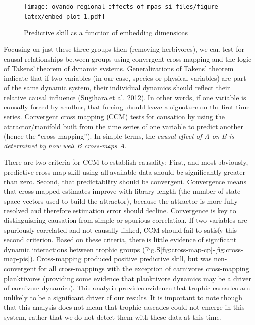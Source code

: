 \documentclass[]{article}
\begin{document}
\begin{figure}
\centering
\texttt{[image: ovando-regional-effects-of-mpas-si\_files/figure-latex/embed-plot-1.pdf]}
\caption{\label{fig:embed-plot}Predictive skill as a function of embedding dimensions}
\end{figure}

Focusing on just these three groups then (removing herbivores), we can test for causal relationships between groups using convergent cross mapping and the logic of Takens' theorem of dynamic systems. Generalizations of Takens' theorem indicate that if two variables (in our case, species or physical variables) are part of the same dynamic system, their individual dynamics should reflect their relative causal influence (Sugihara et al. 2012). In other words, if one variable is causally forced by another, that forcing should leave a signature on the first time series. Convergent cross mapping (CCM) tests for causation by using the attractor/manifold built from the time series of one variable to predict another (hence the ``cross-mapping''). In simple terms, the \emph{causal effect of A on B is determined by how well B cross-maps A}.

There are two criteria for CCM to establish causality: First, and most obviously, predictive cross-map skill using all available data should be significantly greater than zero. Second, that predictability should be convergent. Convergence means that cross-mapped estimates improve with library length (the number of state-space vectors used to build the attractor), because the attractor is more fully resolved and therefore estimation error should decline. Convergence is key to distinguishing causation from simple or spurious correlation. If two variables are spuriously correlated and not causally linked, CCM should fail to satisfy this second criterion. Based on these criteria, there is little evidence of significant dynamic interactions between trophic groups (Fig.S\ref{fig:cross-map-cp}-\ref{fig:cross-map-pis}). Cross-mapping produced positive predictive skill, but was non-convergent for all cross-mappings with the exception of carnivores cross-mapping planktivores (providing some evidence that planktivore dynamics may be a driver of carnivore dynamics). This analysis provides evidence that trophic cascades are unlikely to be a significant driver of our results. It is important to note though that this analysis does not mean that trophic cascades could not emerge in this system, rather that we do not detect them with these data at this time.
\end{document}

